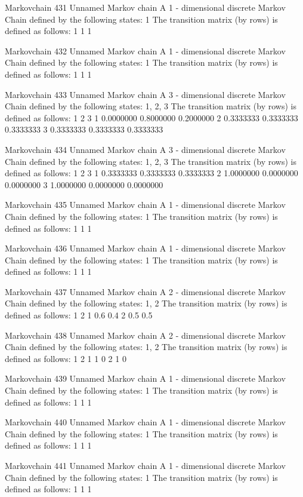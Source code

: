 \documentclass[
  nojss]{jss}
\begin{document}
\begin{CodeChunk}
\begin{CodeOutput}
Markovchain  431 
Unnamed Markov chain 
 A  1 - dimensional discrete Markov Chain defined by the following states: 
 1 
 The transition matrix  (by rows)  is defined as follows: 
  1
1 1

Markovchain  432 
Unnamed Markov chain 
 A  1 - dimensional discrete Markov Chain defined by the following states: 
 1 
 The transition matrix  (by rows)  is defined as follows: 
  1
1 1

Markovchain  433 
Unnamed Markov chain 
 A  3 - dimensional discrete Markov Chain defined by the following states: 
 1, 2, 3 
 The transition matrix  (by rows)  is defined as follows: 
          1         2         3
1 0.0000000 0.8000000 0.2000000
2 0.3333333 0.3333333 0.3333333
3 0.3333333 0.3333333 0.3333333

Markovchain  434 
Unnamed Markov chain 
 A  3 - dimensional discrete Markov Chain defined by the following states: 
 1, 2, 3 
 The transition matrix  (by rows)  is defined as follows: 
          1         2         3
1 0.3333333 0.3333333 0.3333333
2 1.0000000 0.0000000 0.0000000
3 1.0000000 0.0000000 0.0000000

Markovchain  435 
Unnamed Markov chain 
 A  1 - dimensional discrete Markov Chain defined by the following states: 
 1 
 The transition matrix  (by rows)  is defined as follows: 
  1
1 1

Markovchain  436 
Unnamed Markov chain 
 A  1 - dimensional discrete Markov Chain defined by the following states: 
 1 
 The transition matrix  (by rows)  is defined as follows: 
  1
1 1

Markovchain  437 
Unnamed Markov chain 
 A  2 - dimensional discrete Markov Chain defined by the following states: 
 1, 2 
 The transition matrix  (by rows)  is defined as follows: 
    1   2
1 0.6 0.4
2 0.5 0.5

Markovchain  438 
Unnamed Markov chain 
 A  2 - dimensional discrete Markov Chain defined by the following states: 
 1, 2 
 The transition matrix  (by rows)  is defined as follows: 
  1 2
1 1 0
2 1 0

Markovchain  439 
Unnamed Markov chain 
 A  1 - dimensional discrete Markov Chain defined by the following states: 
 1 
 The transition matrix  (by rows)  is defined as follows: 
  1
1 1

Markovchain  440 
Unnamed Markov chain 
 A  1 - dimensional discrete Markov Chain defined by the following states: 
 1 
 The transition matrix  (by rows)  is defined as follows: 
  1
1 1

Markovchain  441 
Unnamed Markov chain 
 A  1 - dimensional discrete Markov Chain defined by the following states: 
 1 
 The transition matrix  (by rows)  is defined as follows: 
  1
1 1


\end{CodeOutput}
\end{CodeChunk}
\end{document}

